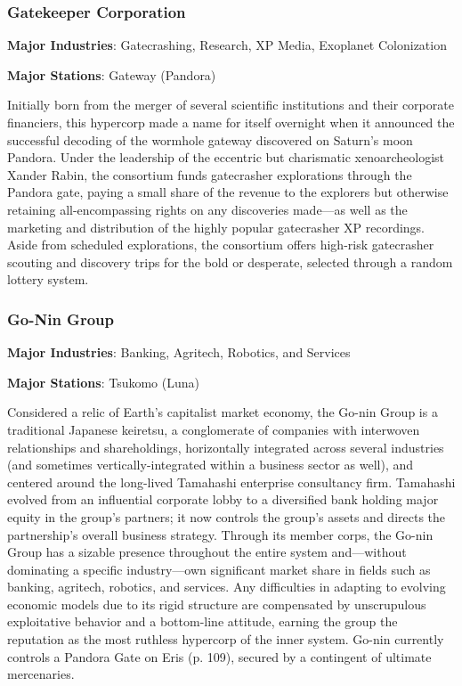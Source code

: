 \subsubsection{Gatekeeper Corporation}
\label{sec:gatek-corp}

\textbf{Major Industries}: Gatecrashing, Research, XP Media, Exoplanet Colonization

\textbf{Major Stations}: Gateway (Pandora)


Initially born from the merger of several scientific institutions and
their corporate financiers, this hypercorp made a name for itself
overnight when it announced the successful decoding of the wormhole
gateway discovered on Saturn's moon Pandora. Under the leadership of
the eccentric but charismatic xenoarcheologist Xander Rabin, the
consortium funds gatecrasher explorations through the Pandora gate,
paying a small share of the revenue to the explorers but otherwise
retaining all-encompassing rights on any discoveries made—as well as
the marketing and distribution of the highly popular gatecrasher XP
recordings. Aside from scheduled explorations, the consortium offers
high-risk gatecrasher scouting and discovery trips for the bold or
desperate, selected through a random lottery system.

\subsubsection{Go-Nin Group}
\label{sec:go-nin-group}

\textbf{Major Industries}: Banking, Agritech, Robotics, and Services

\textbf{Major Stations}: Tsukomo (Luna)


Considered a relic of Earth's capitalist market economy, the Go-nin
Group is a traditional Japanese keiretsu, a conglomerate of companies
with interwoven relationships and shareholdings, horizontally
integrated across several industries (and sometimes
vertically-integrated within a business sector as well), and centered
around the long-lived Tamahashi enterprise consultancy firm. Tamahashi
evolved from an influential corporate lobby to a diversified bank
holding major equity in the group's partners; it now controls the
group's assets and directs the partnership's overall business
strategy. Through its member corps, the Go-nin Group has a sizable
presence throughout the entire system and—without dominating a
specific industry—own significant market share in fields such as
banking, agritech, robotics, and services. Any difficulties in
adapting to evolving economic models due to its rigid structure are
compensated by unscrupulous exploitative behavior and a bottom-line
attitude, earning the group the reputation as the most ruthless
hypercorp of the inner system. Go-nin currently controls a Pandora
Gate on Eris (p. 109), secured by a contingent of ultimate
mercenaries.

